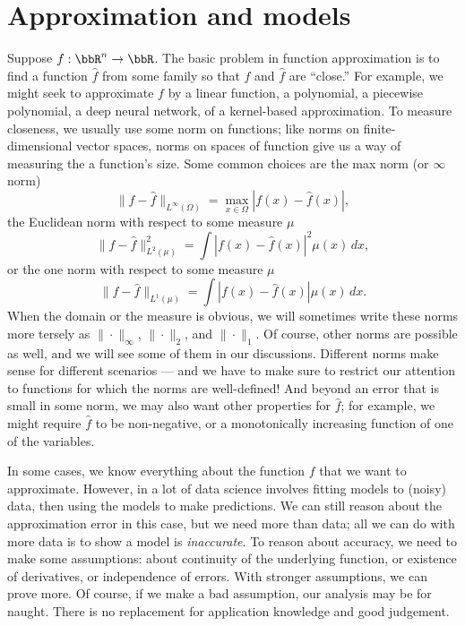 \documentclass[12pt, leqno]{article} %
\begin{document}



\section{Approximation and models}

Suppose $f : \bbR^n \rightarrow \bbR$.  The basic problem in function
approximation is to find a function $\hat{f}$ from some family
so that $f$ and $\hat{f}$ are ``close.''  For example, we might seek
to approximate $f$ by a linear function, a polynomial, a piecewise
polynomial, a deep neural network, of a kernel-based approximation.
To measure closeness, we usually use some norm on functions;
like norms on finite-dimensional vector spaces, norms on spaces
of function give us a way of measuring the a function's size.
Some common choices are the max norm (or $\infty$ norm)
\[
  \|f-\hat{f}\|_{L^\infty(\Omega)} = \max_{x \in \Omega} |f(x)-\hat{f}(x)|,
\]
the Euclidean norm with respect to some measure $\mu$
\[
  \|f-\hat{f}\|_{L^2(\mu)}^2 = \int |f(x)-\hat{f}(x)|^2 \mu(x) \, dx,
\]
or the one norm with respect to some measure $\mu$
\[
  \|f-\hat{f}\|_{L^1(\mu)} = \int |f(x)-\hat{f}(x)| \mu(x) \, dx.
\]
When the domain or the measure is obvious, we will sometimes write
these norms more tersely as $\|\cdot\|_\infty$, $\|\cdot\|_2$, and
$\|\cdot\|_1$.  Of course, other norms are possible as well, and we
will see some of them in our discussions.
Different norms make sense for different scenarios --- and we have to
make sure to restrict our attention to functions for which the norms
are well-defined!  And beyond an error that is small in some norm, we may also
want other properties for $\hat{f}$; for example, we might require
$\hat{f}$ to be non-negative, or a monotonically increasing function
of one of the variables.

In some cases, we know everything about the function $f$ that we want
to approximate.  However, in a lot of data science involves fitting
models to (noisy) data, then using the models to make predictions.  We
can still reason about the approximation error in this case, but we
need more than data; all we can do with more data is to show a model
is {\em inaccurate}.  To reason about accuracy, we need to make some
assumptions: about continuity of the underlying function, or existence
of derivatives, or independence of errors.  With stronger assumptions,
we can prove more.  Of course, if we make a bad assumption, our
analysis may be for naught.  There is no replacement for application
knowledge and good judgement.
\end{document}
